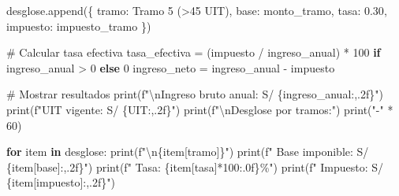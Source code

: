 \documentclass[
  doc,
  floatsintext,
  longtable,
  a4paper,
  nolmodern,
  notxfonts,
  notimes,
  12pt,
  colorlinks=true,linkcolor=blue,citecolor=blue,urlcolor=blue]{apa7}
\newenvironment{Shaded}{\begin{snugshade}}{\end{snugshade}}
\newcommand{\BuiltInTok}[1]{\textcolor[rgb]{0.00,0.23,0.31}{#1}}
\newcommand{\CharTok}[1]{\textcolor[rgb]{0.13,0.47,0.30}{#1}}
\newcommand{\CommentTok}[1]{\textcolor[rgb]{0.37,0.37,0.37}{#1}}
\newcommand{\ControlFlowTok}[1]{\textcolor[rgb]{0.00,0.23,0.31}{\textbf{#1}}}
\newcommand{\DecValTok}[1]{\textcolor[rgb]{0.68,0.00,0.00}{#1}}
\newcommand{\FloatTok}[1]{\textcolor[rgb]{0.68,0.00,0.00}{#1}}
\newcommand{\KeywordTok}[1]{\textcolor[rgb]{0.00,0.23,0.31}{\textbf{#1}}}
\newcommand{\NormalTok}[1]{\textcolor[rgb]{0.00,0.23,0.31}{#1}}
\newcommand{\OperatorTok}[1]{\textcolor[rgb]{0.37,0.37,0.37}{#1}}
\newcommand{\SpecialCharTok}[1]{\textcolor[rgb]{0.37,0.37,0.37}{#1}}
\newcommand{\SpecialStringTok}[1]{\textcolor[rgb]{0.13,0.47,0.30}{#1}}
\newcommand{\StringTok}[1]{\textcolor[rgb]{0.13,0.47,0.30}{#1}}
\begin{document}
\begin{Shaded}
\begin{Highlighting}[]
\NormalTok{            desglose.append(\{}
                \StringTok{\textquotesingle{}tramo\textquotesingle{}}\NormalTok{: }\StringTok{\textquotesingle{}Tramo 5 (\textgreater{}45 UIT)\textquotesingle{}}\NormalTok{,}
                \StringTok{\textquotesingle{}base\textquotesingle{}}\NormalTok{: monto\_tramo,}
                \StringTok{\textquotesingle{}tasa\textquotesingle{}}\NormalTok{: }\FloatTok{0.30}\NormalTok{,}
                \StringTok{\textquotesingle{}impuesto\textquotesingle{}}\NormalTok{: impuesto\_tramo}
\NormalTok{            \})}
        
        \CommentTok{\# Calcular tasa efectiva}
\NormalTok{        tasa\_efectiva }\OperatorTok{=}\NormalTok{ (impuesto }\OperatorTok{/}\NormalTok{ ingreso\_anual) }\OperatorTok{*} \DecValTok{100} \ControlFlowTok{if}\NormalTok{ ingreso\_anual }\OperatorTok{\textgreater{}} \DecValTok{0} \ControlFlowTok{else} \DecValTok{0}
\NormalTok{        ingreso\_neto }\OperatorTok{=}\NormalTok{ ingreso\_anual }\OperatorTok{{-}}\NormalTok{ impuesto}
        
        \CommentTok{\# Mostrar resultados}
        \BuiltInTok{print}\NormalTok{(}\SpecialStringTok{f"}\CharTok{\textbackslash{}n}\SpecialStringTok{Ingreso bruto anual: S/ }\SpecialCharTok{\{}\NormalTok{ingreso\_anual}\SpecialCharTok{:,.2f\}}\SpecialStringTok{"}\NormalTok{)}
        \BuiltInTok{print}\NormalTok{(}\SpecialStringTok{f"UIT vigente: S/ }\SpecialCharTok{\{}\NormalTok{UIT}\SpecialCharTok{:,.2f\}}\SpecialStringTok{"}\NormalTok{)}
        \BuiltInTok{print}\NormalTok{(}\SpecialStringTok{f"}\CharTok{\textbackslash{}n}\SpecialStringTok{Desglose por tramos:"}\NormalTok{)}
        \BuiltInTok{print}\NormalTok{(}\StringTok{"{-}"} \OperatorTok{*} \DecValTok{60}\NormalTok{)}
        
        \ControlFlowTok{for}\NormalTok{ item }\KeywordTok{in}\NormalTok{ desglose:}
            \BuiltInTok{print}\NormalTok{(}\SpecialStringTok{f"}\CharTok{\textbackslash{}n}\SpecialCharTok{\{}\NormalTok{item[}\StringTok{\textquotesingle{}tramo\textquotesingle{}}\NormalTok{]}\SpecialCharTok{\}}\SpecialStringTok{"}\NormalTok{)}
            \BuiltInTok{print}\NormalTok{(}\SpecialStringTok{f"  Base imponible: S/ }\SpecialCharTok{\{}\NormalTok{item[}\StringTok{\textquotesingle{}base\textquotesingle{}}\NormalTok{]}\SpecialCharTok{:,.2f\}}\SpecialStringTok{"}\NormalTok{)}
            \BuiltInTok{print}\NormalTok{(}\SpecialStringTok{f"  Tasa: }\SpecialCharTok{\{}\NormalTok{item[}\StringTok{\textquotesingle{}tasa\textquotesingle{}}\NormalTok{]}\OperatorTok{*}\DecValTok{100}\SpecialCharTok{:.0f\}}\SpecialStringTok{\%"}\NormalTok{)}
            \BuiltInTok{print}\NormalTok{(}\SpecialStringTok{f"  Impuesto: S/ }\SpecialCharTok{\{}\NormalTok{item[}\StringTok{\textquotesingle{}impuesto\textquotesingle{}}\NormalTok{]}\SpecialCharTok{:,.2f\}}\SpecialStringTok{"}\NormalTok{)}
        

\end{Highlighting}
\end{Shaded}
\end{document}

